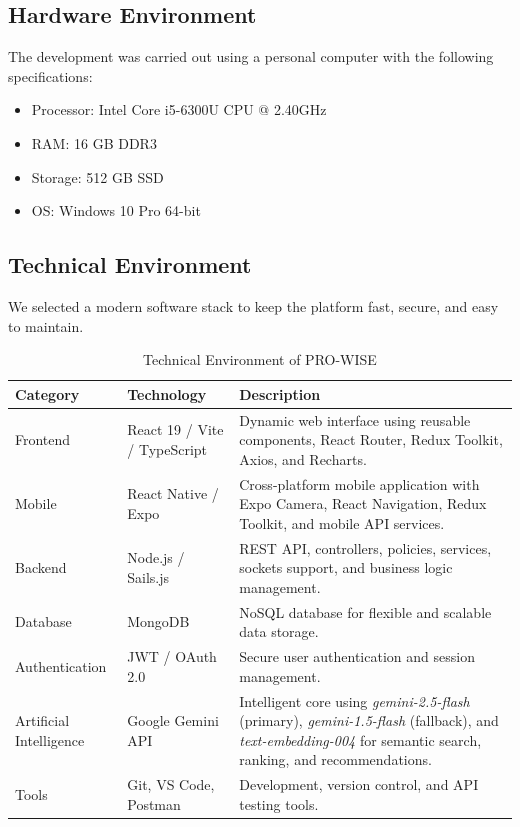 \documentclass[12pt,a4paper]{report}
\begin{document}
\subsection{Hardware Environment}

The development was carried out using a personal computer with the following specifications:

\begin{itemize}
    \item Processor: Intel Core i5-6300U CPU @ 2.40GHz
    \item RAM: 16 GB DDR3
    \item Storage: 512 GB SSD
    \item OS: Windows 10 Pro 64-bit
\end{itemize}

\subsection{Technical Environment}

We selected a modern software stack to keep the platform fast, secure, and easy to maintain.

\begin{table}[H]
\centering
\caption{Technical Environment of PRO-WISE}
\renewcommand{\arraystretch}{1.4}
\setlength{\tabcolsep}{6pt}
\begin{tabular}{p{2.8cm}p{3.4cm}p{7.3cm}}
\toprule
\textbf{Category} & \textbf{Technology} & \textbf{Description} \\
\midrule
Frontend & React 19 / Vite / TypeScript & Dynamic web interface using reusable components, React Router, Redux Toolkit, Axios, and Recharts. \\
Mobile & React Native / Expo & Cross-platform mobile application with Expo Camera, React Navigation, Redux Toolkit, and mobile API services. \\
Backend & Node.js / Sails.js & REST API, controllers, policies, services, sockets support, and business logic management. \\
Database & MongoDB & NoSQL database for flexible and scalable data storage. \\
Authentication & JWT / OAuth 2.0 & Secure user authentication and session management. \\
Artificial Intelligence & Google Gemini API \cite{gemini} & Intelligent core using \textit{gemini-2.5-flash} (primary), \textit{gemini-1.5-flash} (fallback), and \textit{text-embedding-004} for semantic search, ranking, and recommendations. \\
Tools & Git, VS Code, Postman & Development, version control, and API testing tools. \\
\bottomrule
\end{tabular}
\end{table}
\end{document}
